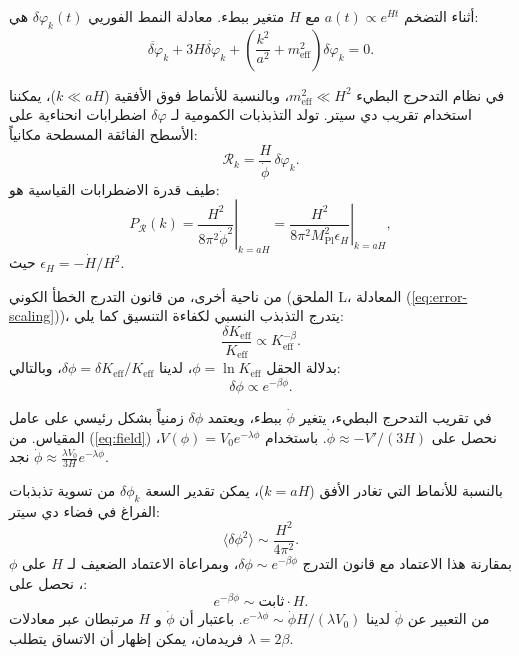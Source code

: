 \documentclass[11pt,a4paper]{article}
\theoremstyle{remark}
\newcommand{\Keff}{K_{\mathrm{eff}}}
\newcommand{\Mpl}{M_{\mathrm{Pl}}}
\begin{document}
	أثناء التضخم $a(t) \propto e^{Ht}$ مع $H$ متغير ببطء. معادلة النمط الفوريي $\delta\varphi_k(t)$ هي:
	\begin{equation}
		\ddot{\delta\varphi}_k + 3H\dot{\delta\varphi}_k + \left( \frac{k^2}{a^2} + m_{\mathrm{eff}}^2 \right) \delta\varphi_k = 0.
	\end{equation}
	
	في نظام التدحرج البطيء $m_{\mathrm{eff}}^2 \ll H^2$، وبالنسبة للأنماط فوق الأفقية ($k \ll aH$)، يمكننا استخدام تقريب دي سيتر. تولد التذبذبات الكمومية لـ $\delta\varphi$ اضطرابات انحناءية على الأسطح الفائقة المسطحة مكانياً:
	\begin{equation}
		\mathcal{R}_k = \frac{H}{\dot{\phi}} \, \delta\varphi_k.
	\end{equation}
	طيف قدرة الاضطرابات القياسية هو:
	\begin{equation}
		P_{\mathcal{R}}(k) = \left. \frac{H^2}{8\pi^2 \dot{\phi}^2} \right|_{k=aH} = \left. \frac{H^2}{8\pi^2 \Mpl^2 \epsilon_H} \right|_{k=aH},
	\end{equation}
	حيث $\epsilon_H = -\dot{H}/H^2$.
	
	من ناحية أخرى، من قانون التدرج الخطأ الكوني (الملحق L، المعادلة (\ref{eq:error-scaling}))، يتدرج التذبذب النسبي لكفاءة التنسيق كما يلي:
	\begin{equation}
		\frac{\delta\Keff}{\Keff} \propto \Keff^{-\beta}.
	\end{equation}
	بدلالة الحقل $\phi = \ln\Keff$، لدينا $\delta\phi = \delta\Keff/\Keff$، وبالتالي:
	\begin{equation}
		\delta\phi \propto e^{-\beta\phi}.
	\end{equation}
	
	في تقريب التدحرج البطيء، يتغير $\dot{\phi}$ ببطء، ويعتمد $\delta\phi$ زمنياً بشكل رئيسي على عامل المقياس. من (\ref{eq:field}) نحصل على $\dot{\phi} \approx -V'/(3H)$. باستخدام $V(\phi) = V_0 e^{-\lambda\phi}$، نجد $\dot{\phi} \approx \frac{\lambda V_0}{3H} e^{-\lambda\phi}$.
	
	بالنسبة للأنماط التي تغادر الأفق ($k = aH$)، يمكن تقدير السعة $\delta\phi_k$ من تسوية تذبذبات الفراغ في فضاء دي سيتر:
	\begin{equation}
		\langle \delta\phi^2 \rangle \sim \frac{H^2}{4\pi^2}.
	\end{equation}
	بمقارنة هذا الاعتماد مع قانون التدرج $\delta\phi \sim e^{-\beta\phi}$، وبمراعاة الاعتماد الضعيف لـ $H$ على $\phi$، نحصل على:
	\begin{equation}
		e^{-\beta\phi} \sim \text{ثابت} \cdot H.
	\end{equation}
	من التعبير عن $\dot{\phi}$ لدينا $e^{-\lambda\phi} \sim \dot{\phi} H / (\lambda V_0)$. باعتبار أن $\dot{\phi}$ و $H$ مرتبطان عبر معادلات فريدمان، يمكن إظهار أن الاتساق يتطلب $\lambda = 2\beta$.
	
\end{document}
